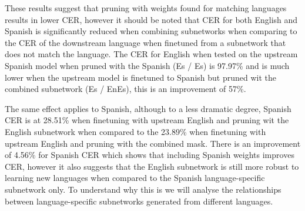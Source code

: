 These results suggest that pruning with weights found for matching languages results in lower CER, however it should be noted that CER for both English and Spanish is significantly reduced when combining subnetworks when comparing to the CER of the downstream language when finetuned from a subnetwork that does not match the language. The CER for English when tested on the upstream Spanish model when pruned with the Spanish (Es / Es) is 97.97\% and is much lower when the upstream model is finetuned to Spanish but pruned wit the combined subnetwork (Es / EnEs), this is an improvement of 57\%. 

The same effect applies to Spanish, although to a less dramatic degree, Spanish CER is at 28.51\% when finetuning with upstream English and pruning wit the English subnetwork when compared to the 23.89\% when finetuning with upstream English and pruning with the combined mask. There is an improvement of 4.56\% for Spanish CER which shows that including Spanish weights improves CER, however it also suggests that the English subnetwork is still more robust to learning new languages when compared to the Spanish language-specific subnetwork only. To understand why this is we will analyse the relationships between language-specific subnetworks generated from different languages. 





